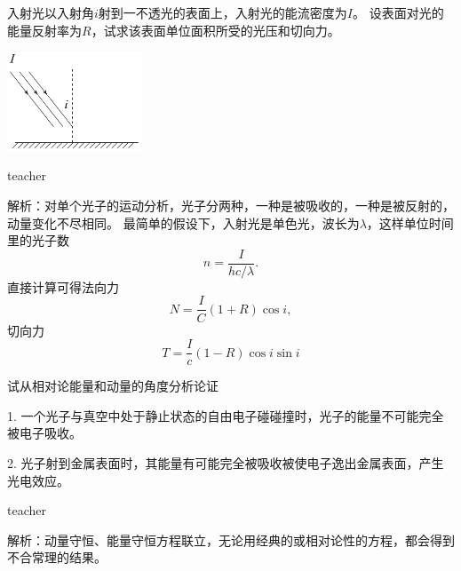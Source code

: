 \begin{example}
入射光以入射角$i$射到一不透光的表面上，入射光的能流密度为$I$。
设表面对光的能量反射率为$R$，试求该表面单位面积所受的光压和切向力。
\begin{flushright}
\includegraphics[width = 0.3\textwidth]{images/particle-11.pdf} 
\end{flushright}

\begin{taggedblock}{teacher}

解析：对单个光子的运动分析，光子分两种，一种是被吸收的，一种是被反射的，动量变化不尽相同。
最简单的假设下，入射光是单色光，波长为$\lambda$，这样单位时间里的光子数
\[
n = \frac{I}{hc/\lambda}.
\]
直接计算可得法向力
\[
N = \frac{I}{C}(1+R)\cos i,
\]
切向力
\[
T = \frac{I}{c}(1-R)\cos i\sin i
\]
\end{taggedblock}
\end{example}


\begin{example}

试从相对论能量和动量的角度分析论证 

1. 一个光子与真空中处于静止状态的自由电子碰碰撞时，光子的能量不可能完全被电子吸收。

2. 光子射到金属表面时，其能量有可能完全被吸收被使电子逸出金属表面，产生光电效应。 

\begin{taggedblock}{teacher}

解析：动量守恒、能量守恒方程联立，无论用经典的或相对论性的方程，都会得到不合常理的结果。
\end{taggedblock}
\end{example}


